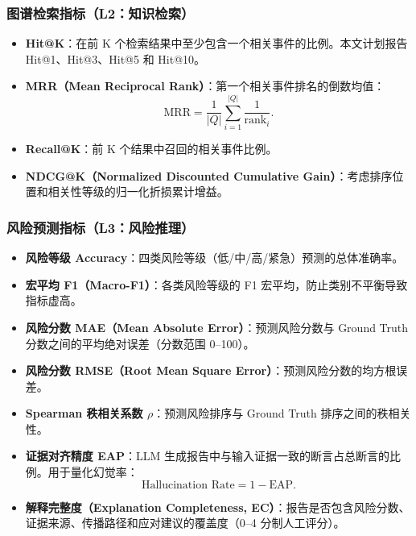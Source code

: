 \documentclass[12pt,a4paper]{article}
\newcommand{\term}[1]{\textbf{#1}}
\begin{document}
\subsubsection{图谱检索指标（L2：知识检索）}

\begin{itemize}
    \item \term{Hit@K}：在前 K 个检索结果中至少包含一个相关事件的比例。本文计划报告 Hit@1、Hit@3、Hit@5 和 Hit@10。
    \item \term{MRR（Mean Reciprocal Rank）}：第一个相关事件排名的倒数均值：
    \begin{equation}
    \text{MRR} = \frac{1}{|Q|}\sum_{i=1}^{|Q|}\frac{1}{\text{rank}_i}.
    \end{equation}
    \item \term{Recall@K}：前 K 个结果中召回的相关事件比例。
    \item \term{NDCG@K（Normalized Discounted Cumulative Gain）}：考虑排序位置和相关性等级的归一化折损累计增益。
\end{itemize}

\subsubsection{风险预测指标（L3：风险推理）}

\begin{itemize}
    \item \term{风险等级 Accuracy}：四类风险等级（低/中/高/紧急）预测的总体准确率。
    \item \term{宏平均 F1（Macro-F1）}：各类风险等级的 F1 宏平均，防止类别不平衡导致指标虚高。
    \item \term{风险分数 MAE（Mean Absolute Error）}：预测风险分数与 Ground Truth 分数之间的平均绝对误差（分数范围 0--100）。
    \item \term{风险分数 RMSE（Root Mean Square Error）}：预测风险分数的均方根误差。
    \item \term{Spearman 秩相关系数 $\rho$}：预测风险排序与 Ground Truth 排序之间的秩相关性。
    \item \term{证据对齐精度 EAP}：LLM 生成报告中与输入证据一致的断言占总断言的比例。用于量化幻觉率：
    \begin{equation}
    \text{Hallucination Rate} = 1 - \text{EAP}.
    \end{equation}
    \item \term{解释完整度（Explanation Completeness, EC）}：报告是否包含风险分数、证据来源、传播路径和应对建议的覆盖度（0--4 分制人工评分）。
\end{itemize}
\end{document}
